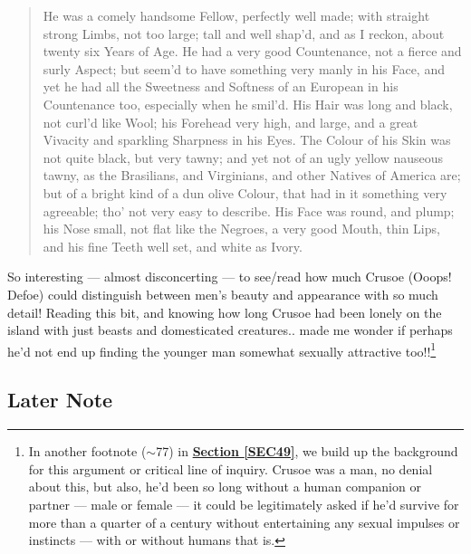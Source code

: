 \documentclass[a4paper]{article}
\begin{document}
\noindent
\begin{minipage}{1\textwidth}
\vspace{1em}
\begin{quotation}
{\ttfamily


He was a comely handsome Fellow, perfectly well made; with straight strong Limbs, not too large; tall and well shap’d, and as I reckon, about twenty six Years of Age. He had a very good Countenance, not a fierce and surly Aspect; but seem’d to have something very manly in his Face, and yet he had all the Sweetness and Softness of an European in his Countenance too, especially when he smil’d. His Hair was long and black, not curl’d like Wool; his Forehead very high, and large, and a great Vivacity and sparkling Sharpness in his Eyes. The Colour of his Skin was not quite black, but very tawny; and yet not of an ugly yellow nauseous tawny, as the Brasilians, and Virginians, and other Natives of America are; but of a bright kind of a dun olive Colour, that had in it something very agreeable; tho’ not very easy to describe. His Face was round, and plump; his Nose small, not flat like the Negroes, a very good Mouth, thin Lips, and his fine Teeth well set, and white as Ivory.


}
\end{quotation}
\vspace{1em}
\end{minipage}



So interesting --- almost disconcerting --- to see/read how much Crusoe (Ooops! Defoe) could distinguish between men's beauty and appearance with so much detail! Reading this bit, and knowing how long Crusoe had been lonely on the island with just beasts and domesticated creatures.. made me wonder if perhaps he'd not end up finding the younger man somewhat sexually attractive too!!\footnote{In another footnote ($\sim$77) in \textbf{\hyperref[SEC49]{Section \ref{SEC49}}}, we build up the background for this argument or critical line of inquiry. Crusoe was a man, no denial about this, but also, he'd been so long without a human companion or partner --- male or female --- it could be legitimately asked if he'd survive for more than a quarter of a century without entertaining any sexual impulses or instincts --- with or without humans that is.}


\subsection{Later Note} 
\end{document}

